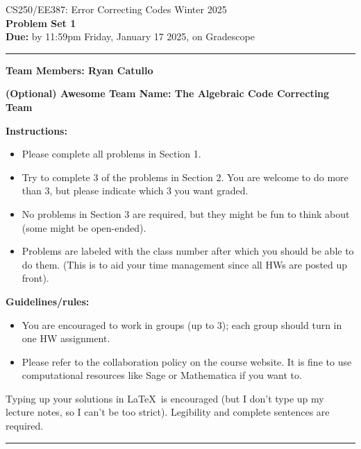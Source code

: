 \documentclass{article}
\begin{document}
\noindent CS250/EE387: Error Correcting Codes \hfill  Winter 2025\\
\textbf{Problem Set 1} \\
\textbf{Due:} by 11:59pm Friday, January 17 2025, on Gradescope \\
\hrule

\begin{shaded}

\textbf{Team Members: Ryan Catullo}

\textbf{(Optional) Awesome Team Name: The Algebraic Code Correcting Team}

\end{shaded}


\vspace{.5cm}
\noindent \textbf{Instructions:} 
\begin{itemize}
\item Please complete all problems in Section 1.  
\item Try to complete 3 of the problems in Section 2.  You are welcome to do more than 3, but please indicate which 3 you want graded.  
\item No problems in Section 3 are required, but they might be fun to think about (some might be open-ended).  
\item Problems are labeled with the class number after which you should be able to do them.  (This is to aid your time management since all HWs are posted up front).
\end{itemize}
\noindent \textbf{Guidelines/rules:}
\begin{itemize}
\item You are encouraged to work in groups (up to 3); each group should turn in one HW assignment.
\item Please refer to the collaboration policy on the course website.  
It is fine to use computational resources like Sage or Mathematica if you want to.
\end{itemize}
Typing up your solutions in \LaTeX \ is encouraged (but I don't type up my lecture notes, so I can't be too strict).  Legibility and complete sentences are required.  
\\
\hrule
\end{document}
